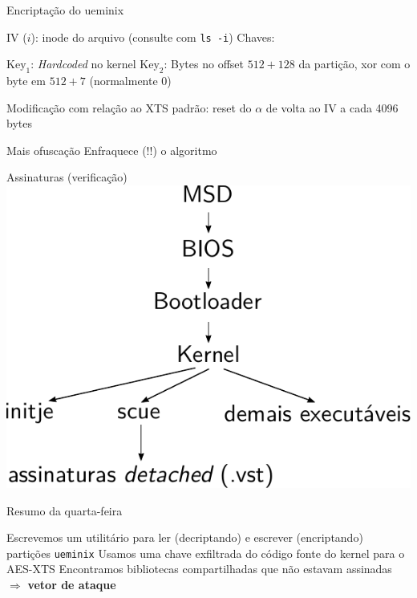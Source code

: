 \documentclass[14pt]{beamer}
\begin{document}
\begin{frame}{Encriptação do ueminix}
  \begin{fullpageitemize}
    \itemR IV ($i$): inode do arquivo (consulte com \texttt{ls -i})
    \itemR Chaves:
      \begin{itemize}
        \itemR $\mathrm{Key}_1$: \textit{Hardcoded} no kernel
        \itemR $\mathrm{Key}_2$: Bytes no offset $512+128$ da partição, xor com o byte em $512+7$ (normalmente 0)
      \end{itemize}
    \itemR Modificação com relação ao XTS padrão: reset do $\alpha$ de volta ao IV a cada 4096 bytes
      \begin{itemize}
        \itemR Mais ofuscação
        \itemR Enfraquece (!!) o algoritmo
      \end{itemize}
  \end{fullpageitemize}
\end{frame}

\begin{frame}{Assinaturas (verificação)}
  \vfill
  {\centering
  \includegraphics[width=\textwidth,height=0.90\textheight,keepaspectratio]{images/assinaturas_sistema}}
  \vfill
\end{frame}

\begin{frame}{Resumo da quarta-feira}
  \begin{fullpageitemize}
    \itemR Escrevemos um utilitário para ler (decriptando) e escrever (encriptando) partições \texttt{ueminix}
    \itemR Usamos uma chave exfiltrada do código fonte do kernel para o AES-XTS
    \itemR Encontramos bibliotecas compartilhadas que não estavam assinadas $\Rightarrow$ \textbf{vetor de ataque}
  \end{fullpageitemize}
\end{frame}
\end{document}
